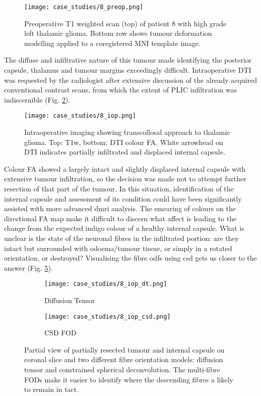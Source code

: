 \begin{figure}
  \centering
  \texttt{[image: case\_studies/8\_preop.png]}
  \caption{Preoperative T1 weighted scan (top) of patient 8 with high grade left thalamic glioma. Bottom row shows tumour deformation modelling applied to a coregistered MNI template image.}
  \label{fig:8p}
\end{figure}

The diffuse and infiltrative nature of this tumour made identifying the posterior capsule, thalamus and tumour margins exceedingly difficult.
Intraoperative DTI was requested by the radiologist after extensive discussion of the already acquired conventional contrast scans, from which the extent of PLIC infiltration was indiscernible (Fig. \ref{fig:8i}).

\begin{figure}
  \centering
  \texttt{[image: case\_studies/8\_iop.png]}
  \caption{Intraoperative imaging showing transcollosal approach to thalamic glioma. Top: T1w, bottom: DTI colour FA. White arrowhead on DTI indicates partially infiltrated and displaced internal capsule.}
  \label{fig:8i}
\end{figure}

Colour FA showed a largely intact and slightly displaced internal capsule with extensive tumour infiltration, so the decision was made not to attempt further resection of that part of the tumour.
In this situation, identification of the internal capsule and assessment of its condition could have been significantly assisted with more advanced \gls{dmri} analysis.
The smearing of colours on the directional FA map make it difficult to discern what affect is leading to the change from the expected indigo colour of a healthy internal capsule.
What is unclear is the state of the neuronal fibres in the infiltrated portion: are they intact but surrounded with odoema/tumour tissue, or simply in a rotated orientation, or destroyed?
Visualising the fibre \glspl{odf} using \gls{csd} gets us closer to the answer (Fig. \ref{fig:8i_fod}).

\begin{figure}
  \centering
  \begin{subfigure}{0.3\textwidth}
    \centering
    \texttt{[image: case\_studies/8\_iop\_dt.png]}
    \caption{Diffusion Tensor}
    \label{fig:8i_dt}
  \end{subfigure}%
  \begin{subfigure}{0.3\textwidth}
    \centering
    \texttt{[image: case\_studies/8\_iop\_csd.png]}
    \caption{CSD FOD}
    \label{fig:8i_csd}
  \end{subfigure}%
  \caption{Partial view of partially resected tumour and internal capsule on coronal slice and two different fibre orientation models: diffusion tensor and constrained spherical deconvolution. The multi-fibre FODs make it easier to identify where the descending fibres a likely to remain in tact.}
  \label{fig:8i_fod}
\end{figure}

